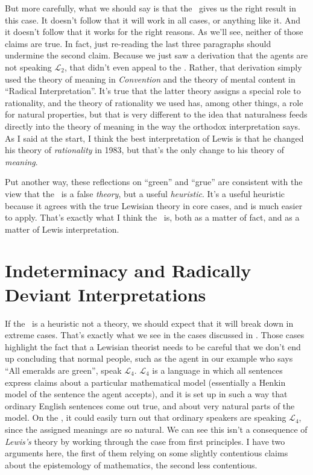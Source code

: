 But more carefully, what we should say is that the \UNT\ gives us the right result in this case. It doesn't follow that it will work in all cases, or anything like it. And it doesn't follow that it works for the right reasons. As we'll see, neither of those claims are true. In fact, just re-reading the last three paragraphs should undermine the second claim. Because we just saw a derivation that the agents are not speaking $\mathcal{L}_2$, that didn't even appeal to the \UNT. Rather, that derivation simply used the theory of meaning in \textit{Convention} \nocite{Lewis1969a} and the theory of mental content in ``Radical Interpretation''. \nocite{Lewis1974c} It's true that the latter theory assigns a special role to rationality, and the theory of rationality we used has, among other things, a role for natural properties, but that is very different to the idea that naturalness feeds directly into the theory of meaning in the way the orthodox interpretation says. As I said at the start, I think the best interpretation of Lewis is that he changed his theory of \textit{rationality} in 1983, but that's the only change to his theory of \textit{meaning}.

Put another way, these reflections on ``green'' and ``grue'' are consistent with the view that the \UNT\ is a false \textit{theory}, but a useful \textit{heuristic}. It's a useful heuristic because it agrees with the true Lewisian theory in core cases, and is much easier to apply. That's exactly what I think the \UNT\ is, both as a matter of fact, and as a matter of Lewis interpretation. 

\section{Indeterminacy and Radically Deviant Interpretations}

If the \UNT\ is a heuristic not a theory, we should expect that it will break down in extreme cases. That's exactly what we see in the cases discussed in \citet{Williams2007}. Those cases highlight the fact that a Lewisian theorist needs to be careful that we don't end up concluding that normal people, such as the agent in our example who says ``All emeralds are green'', speak $\mathcal{L}_4$. $\mathcal{L}_4$ is a language in which all sentences express claims about a particular mathematical model (essentially a Henkin model of the sentence the agent accepts), and it is set up in such a way that ordinary English sentences come out true, and about very natural parts of the model. On the \UNT, it could easily turn out that ordinary speakers are speaking $\mathcal{L}_4$, since the assigned meanings are so natural. We can see this isn't a consequence of \textit{Lewis's} theory by working through the case from first principles. I have two arguments here, the first of them relying on some slightly contentious claims about the epistemology of mathematics, the second less contentious.

